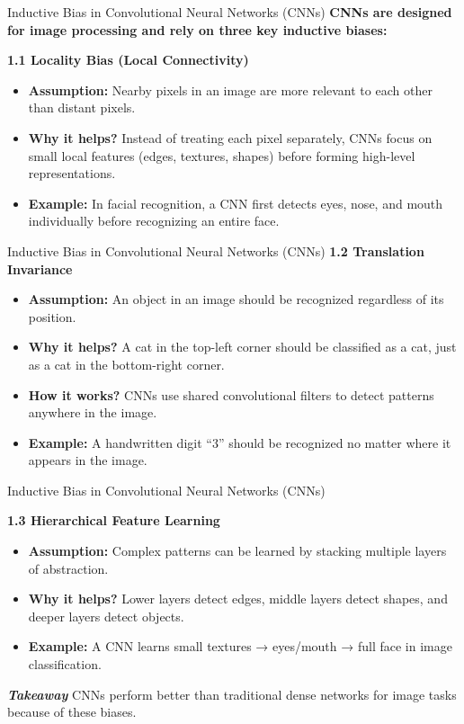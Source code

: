 \documentclass{beamer}
\begin{document}
\begin{frame}{Inductive Bias in Convolutional Neural Networks (CNNs)}
    \textbf{CNNs are designed for image processing and rely on three key inductive biases:}
    
    \textbf{1.1 Locality Bias (Local Connectivity)}
    \begin{itemize}
        \item \textbf{Assumption:} Nearby pixels in an image are more relevant to each other than distant pixels.
        \item \textbf{Why it helps?} Instead of treating each pixel separately, CNNs focus on small local features (edges, textures, shapes) before forming high-level representations.
        \item \textbf{Example:} In facial recognition, a CNN first detects eyes, nose, and mouth individually before recognizing an entire face.
    \end{itemize}
\end{frame}
\begin{frame}{Inductive Bias in Convolutional Neural Networks (CNNs)}
    \textbf{1.2 Translation Invariance}
    \begin{itemize}
        \item \textbf{Assumption:} An object in an image should be recognized regardless of its position.
        \item \textbf{Why it helps?} A cat in the top-left corner should be classified as a cat, just as a cat in the bottom-right corner.
        \item \textbf{How it works?} CNNs use shared convolutional filters to detect patterns anywhere in the image.
        \item \textbf{Example:} A handwritten digit “3” should be recognized no matter where it appears in the image.
    \end{itemize}
\end{frame} 

\begin{frame}{Inductive Bias in Convolutional Neural Networks (CNNs)}
    
    \textbf{1.3 Hierarchical Feature Learning}
    \begin{itemize}
        \item \textbf{Assumption:} Complex patterns can be learned by stacking multiple layers of abstraction.
        \item \textbf{Why it helps?} Lower layers detect edges, middle layers detect shapes, and deeper layers detect objects.
        \item \textbf{Example:} A CNN learns small textures → eyes/mouth → full face in image classification.
    \end{itemize}
    
    \textbf{\textit{Takeaway}} CNNs perform better than traditional dense networks for image tasks because of these biases.
\end{frame}
\end{document}
